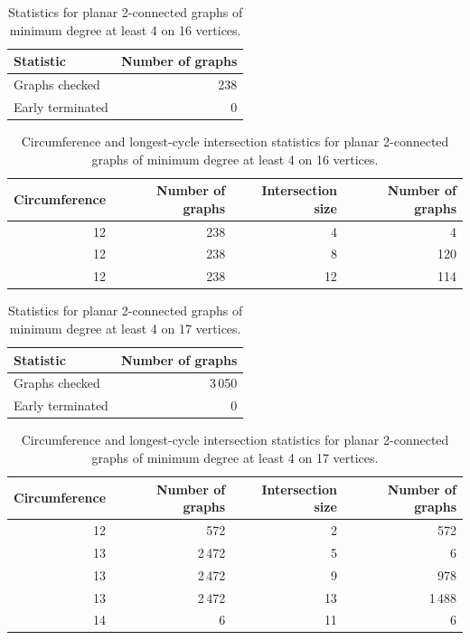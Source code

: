 \begin{table}[ht]
\centering
\caption{Statistics for planar 2-connected graphs of minimum degree at least 4 on 16 vertices.}
\label{tab:summary-min4-n16}
\begin{tabular}{lr}
\toprule
Statistic & Number of graphs \\
\midrule
Graphs checked & 238 \\
Early terminated & 0 \\
\bottomrule
\end{tabular}
\end{table}


\begin{table}[ht]
\centering
\caption{Circumference and longest-cycle intersection statistics for planar 2-connected graphs of minimum degree at least 4 on 16 vertices.}
\label{tab:circ-intersection-min4-n16}
\begin{tabular}{rrrr}
\toprule
Circumference & Number of graphs & Intersection size & Number of graphs \\
\midrule
12 & 238 & 4 & 4 \\
12 & 238 & 8 & 120 \\
12 & 238 & 12 & 114 \\
\bottomrule
\end{tabular}
\end{table}

\begin{table}[ht]
\centering
\caption{Statistics for planar 2-connected graphs of minimum degree at least 4 on 17 vertices.}
\label{tab:summary-min4-n17}
\begin{tabular}{lr}
\toprule
Statistic & Number of graphs \\
\midrule
Graphs checked & 3\,050 \\
Early terminated & 0 \\
\bottomrule
\end{tabular}
\end{table}


\begin{table}[ht]
\centering
\caption{Circumference and longest-cycle intersection statistics for planar 2-connected graphs of minimum degree at least 4 on 17 vertices.}
\label{tab:circ-intersection-min4-n17}
\begin{tabular}{rrrr}
\toprule
Circumference & Number of graphs & Intersection size & Number of graphs \\
\midrule
12 & 572 & 2 & 572 \\
13 & 2\,472 & 5 & 6 \\
13 & 2\,472 & 9 & 978 \\
13 & 2\,472 & 13 & 1\,488 \\
14 & 6 & 11 & 6 \\
\bottomrule
\end{tabular}
\end{table}

